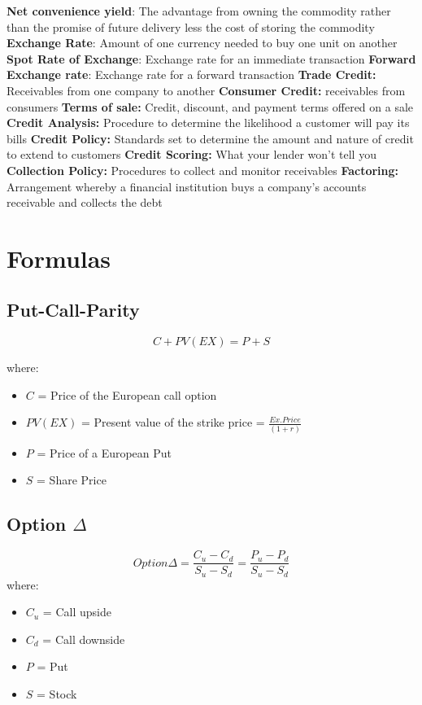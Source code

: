 \documentclass{cheatsheet}
\begin{document}
    \textbf{Net convenience yield}: The advantage from owning the commodity rather than the promise of future delivery less the cost of storing the commodity
    \textbf{Exchange Rate}: Amount of one currency needed to buy one unit on another
    \textbf{Spot Rate of Exchange}: Exchange rate for an immediate transaction
    \textbf{Forward Exchange rate}: Exchange rate for a forward transaction
    \textbf{Trade Credit:} Receivables from one company to another
    \textbf{Consumer Credit:} receivables from consumers
    \textbf{Terms of sale:} Credit, discount, and payment terms offered on a sale
    \textbf{Credit Analysis:} Procedure to determine the likelihood a customer will pay its bills
    \textbf{Credit Policy:} Standards set to determine the amount and nature of credit to extend to customers
    \textbf{Credit Scoring:} What your lender won’t tell you
    \textbf{Collection Policy:} Procedures to collect and monitor receivables
    \textbf{Factoring:} Arrangement whereby a financial institution buys a company's accounts receivable and collects the debt


\section*{Formulas}
\subsection{Put-Call-Parity}
    \[
C + PV(EX) = P + S
\]

\noindent where:
\begin{itemize}
  \item $C$ = Price of the European call option
  \item $PV(EX)$ = Present value of the strike price = $\frac{Ex.Price}{(1+r)}$
  \item $P$ = Price of a European Put
  \item $S$ = Share Price
\end{itemize}
\subsection{Option $\Delta$}
\[Option \Delta = \frac{C_u - C_d}{S_u - S_d} = \frac{P_u - P_d}{S_u - S_d}\]
\noindent where:
\begin{itemize}
  \item $C_u$ = Call upside
  \item $C_d$ = Call downside
  \item $P$ = Put
  \item $S$ = Stock
\end{itemize}
\end{document}
